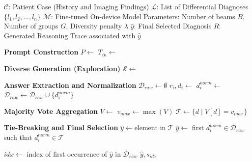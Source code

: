 \documentclass[10pt,journal,compsoc, onecolumn]{IEEEtran}
\begin{document}
\clearpage          %
\vspace*{\fill}     %

\begin{algorithm}[H] %
\caption{Inference protocol for robust diagnostic reasoning.
The algorithm employs diverse group beam search to generate multiple independent reasoning paths ($B$ beams, $G$ groups), followed by majority-vote aggregation to mitigate hallucination and select the most consensus-driven diagnosis.}
\label{alg:inference_workflow}
\begin{algorithmic}[1]
\Require 
    \State $\mathcal{C}$: Patient Case (History and Imaging Findings)
    \State $\mathcal{L}$: List of Differential Diagnoses $\{l_1, l_2, ..., l_n\}$
    \State $\mathcal{M}$: Fine-tuned On-device Model
    \State Parameters: Number of beams $B$, Number of groups $G$, Diversity penalty $\lambda$
\Ensure 
    \State $\hat{y}$: Final Selected Diagnosis
    \State $R$: Generated Reasoning Trace associated with $\hat{y}$

\Statex
\State \textbf{Prompt Construction}
\State $P \leftarrow$  
\State $T_{in} \leftarrow$ 

\Statex
\State \textbf{Diverse Generation (Exploration)}
\State $\mathcal{S} \leftarrow$ 
\State {}

\Statex
\State \textbf{Answer Extraction and Normalization}
\State $\mathcal{D}_{raw} \leftarrow \emptyset$ 
    \State $r_i, d_i \leftarrow$  
    \State $d_i^{norm} \leftarrow$  
    \State $\mathcal{D}_{raw} \leftarrow \mathcal{D}_{raw} \cup \{d_i^{norm}\}$
\EndFor

\Statex
\State \textbf{Majority Vote Aggregation}
\State $V \leftarrow$  
\State $v_{max} \leftarrow \max(V)$
\State $\mathcal{T} \leftarrow \{d \mid V[d] = v_{max}\}$ 

\Statex
\State \textbf{Tie-Breaking and Final Selection}
    \State $\hat{y} \leftarrow \text{element in } \mathcal{T}$
\Else
    \State {}
    \State $\hat{y} \leftarrow$ first $d_i^{norm} \in \mathcal{D}_{raw}$ such that $d_i^{norm} \in \mathcal{T}$
\EndIf

\State $idx \leftarrow$ index of first occurrence of $\hat{y}$ in $\mathcal{D}_{raw}$
\State \Return $\hat{y}, s_{idx}$

\end{algorithmic}
\end{algorithm}
\end{document}
